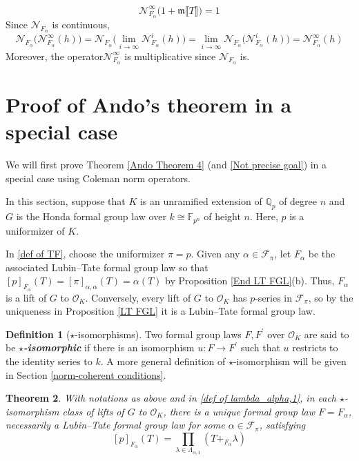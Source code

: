 \documentclass[12pt]{article}
\newtheorem{theorem}{Theorem}[section]
\theoremstyle{definition}
\newtheorem{definition}[theorem]{Definition}
\newcommand{\PS}[1]{\llbracket #1 \rrbracket}
\def\Q{\mathbb{Q}}
\def\F{\mathbb{F}}
\def\TF{\mathscr{F}}
\def\CN{\mathscr{N}}
\def\m{\mathfrak{m}}
\def\O{\mathcal{O}}
\begin{document}
    \begin{equation} \label{kernel of CN^infty}
        \CN_{F_\alpha}^\infty\bigl(1 + \m\PS{T}\bigr) = 1
    \end{equation}
    Since $\CN_{F_\alpha}$ is continuous, 
    \begin{equation*}
        \CN_{F_\alpha}\bigl(\CN_{F_\alpha}^\infty(h)\bigr) = \CN_{F_\alpha}\bigl(\displaystyle\lim_{i \to \infty} \CN_{F_\alpha}^i(h)\bigr) = \displaystyle\lim_{i \to \infty} \CN_{F_\alpha}\bigl(\CN_{F_\alpha}^i(h)\bigr) = \CN_{F_\alpha}^\infty (h)
    \end{equation*}
    Moreover, the operator$\CN_{F_\alpha}^\infty$ is multiplicative since $\CN_{F_\alpha}$ is. 


    \section{Proof of Ando's theorem in a special case} \label{Special Proof}
    We will first prove Theorem \ref{Ando Theorem 4} (and \ref{Not precise goal}) in a special case using Coleman norm operators. \par 
    In this section, suppose that $K$ is an unramified extension of $\Q_p$ of degree $n$ and $G$ is the Honda formal group law over $k \cong \F_{p^n}$ of height $n$. Here, $p$ is a uniformizer of $K$. \par 
    In \eqref{def of TF}, choose the uniformizer $\pi = p$. Given any $\alpha \in \TF_\pi$, let $F_\alpha$ be the associated Lubin--Tate formal group law so that $[p]_{F_\alpha}(T) = [\pi]_{\alpha,\alpha}(T) = \alpha(T)$ by Proposition \ref{End LT FGL}(b). Thus, $F_\alpha$ is a lift of $G$ to $\O_K$. Conversely, every lift of $G$ to $\O_K$ has $p$-series in $\TF_\pi$, so by the uniqueness in Proposition \ref{LT FGL} it is a Lubin--Tate formal group law. 
    \begin{definition} [$\star$-isomorphisms]\label{naive star-iso}
        Two formal group laws $F,F^\prime$ over $\O_K$ are said to be \textbf{\em{$\star$-isomorphic}} if there is an isomorphism $u \colon F \to F^\prime$ such that $u$ restricts to the identity series to $k$. A more general definition of $\star$-isomorphism will be given in Section \ref{norm-coherent conditions}. 
    \end{definition}
    \begin{theorem} \label{Special Ando}
        With notations as above and in \eqref{def of lambda_alpha,1}, in each $\star$-isomorphism class of lifts of $G$ to $\O_K$, there is a unique formal group law $F = F_\alpha$, necessarily a Lubin--Tate formal group law for some $\alpha \in \TF_\pi$, satisfying 
        \begin{equation} \label{Ando's criterion}
            [p]_{F_\alpha}(T) = \prod_{\lambda \in \Lambda_{\alpha,1}}(T +_{F_\alpha} \lambda) 
        \end{equation}
    \end{theorem}
\end{document}
